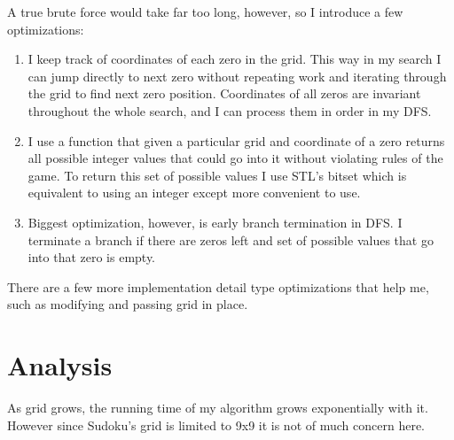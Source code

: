 \documentclass[11pt]{article}
\begin{document}
A true brute force would take far too long, however, so I introduce a few optimizations:  
\begin{enumerate}
\item I keep track of coordinates of each zero in the grid.  This way in my search I can jump directly to next zero without repeating work and iterating through the grid to find next zero position.  Coordinates of all zeros are invariant throughout the whole search, and I can process them in order in my DFS.  
\item I use a function that given a particular grid and coordinate of a zero returns all possible integer values that could go into it without violating rules of the game.  To return this set of possible values I use STL's bitset which is equivalent to using an integer except more convenient to use.
\item Biggest optimization, however, is early branch termination in DFS.  I terminate a branch if there are zeros left and set of possible values that go into that zero is empty.
\end{enumerate}
There are a few more implementation detail type optimizations that help me, such as modifying and passing grid in place.

\section{Analysis}

As grid grows, the running time of my algorithm grows exponentially with it.  However since Sudoku's grid is limited to 9x9 it is not of much concern here.
\end{document}

